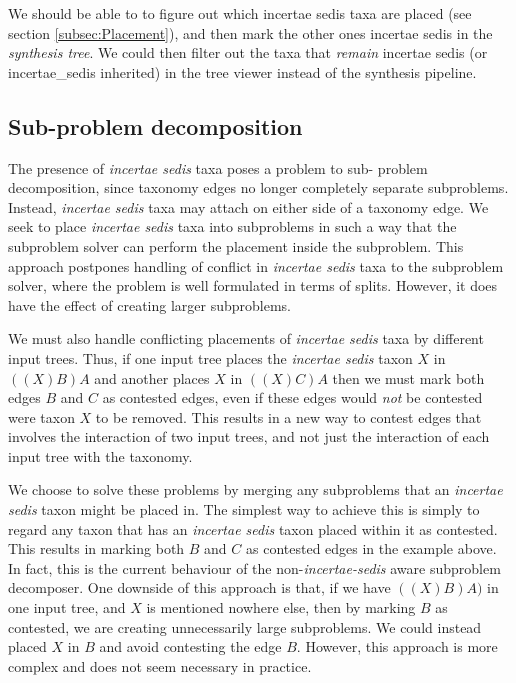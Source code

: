 \documentclass[english]{article}
\begin{document}
We should be able to to figure out which incertae sedis taxa are
placed (see section \ref{subsec:Placement}), and then mark the other
ones incertae sedis in the \emph{synthesis tree}. We could then filter
out the taxa that \emph{remain }incertae sedis (or incertae\_sedis
inherited) in the tree viewer instead of the synthesis pipeline.

\subsection{Sub-problem decomposition}

The presence of \emph{incertae sedis }taxa poses a problem to sub-
problem decomposition, since taxonomy edges no longer completely
separate subproblems. Instead, \emph{incertae sedis} taxa may attach
on either side of a taxonomy edge. We seek to place \emph{incertae
sedis} taxa into subproblems in such a way that the subproblem solver
can perform the placement inside the subproblem. This approach
postpones handling of conflict in \emph{incertae sedis} taxa to the
subproblem solver, where the problem is well formulated in terms of
splits. However, it does have the effect of creating larger
subproblems.

We must also handle conflicting placements of \emph{incertae sedis}
taxa by different input trees. Thus, if one input tree places the
\emph{incertae sedis} taxon $X$ in $((X)B)A$ and another places $X$ in
$((X)C)A$ then we must mark both edges $B$ and $C$ as contested edges,
even if these edges would \emph{not} be contested were taxon $X$ to be
removed. This results in a new way to contest edges that involves the
interaction of two input trees, and not just the interaction of each
input tree with the taxonomy.

We choose to solve these problems by merging any subproblems that an
\emph{incertae sedis} taxon might be placed in. The simplest way to
achieve this is simply to regard any taxon that has an \emph{incertae
sedis }taxon placed within it as contested. This results in marking
both $B$ and $C$ as contested edges in the example above. In fact,
this is the current behaviour of the non-\emph{incertae-sedis} aware
subproblem decomposer. One downside of this approach is that, if we
have $((X)B)A)$ in one input tree, and $X$ is mentioned nowhere else,
then by marking $B$ as contested, we are creating unnecessarily large
subproblems. We could instead placed $X$ in $B$ and avoid contesting
the edge $B$. However, this approach is more complex and does not seem
necessary in practice.
\end{document}

